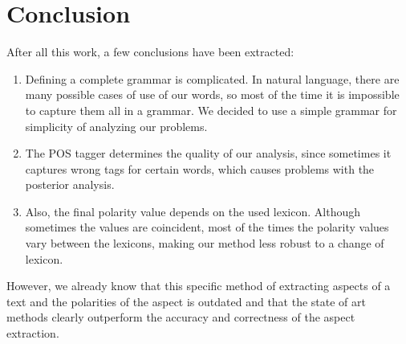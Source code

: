 \documentclass[11pt]{article}
\begin{document}
\section{ Conclusion}

After all this work, a few conclusions have been extracted:
\begin{enumerate}
    \item Defining a complete grammar is complicated. In natural language, there are many possible cases of use of our words, so most of the time it is impossible to capture them all in a grammar. We decided to use a simple grammar for simplicity of analyzing our problems.
    \item The POS tagger determines the quality of our analysis, since sometimes it captures wrong tags for certain words, which causes problems with the posterior analysis.
    \item Also, the final polarity value depends on the used lexicon. Although sometimes the values are coincident, most of the times the polarity values vary between the lexicons, making our method less robust to a change of lexicon.
\end{enumerate}

However, we already know that this specific method of extracting aspects of a text and the polarities of the aspect is outdated and that the state of art methods clearly outperform the accuracy and correctness of the aspect extraction.


\end{document}
